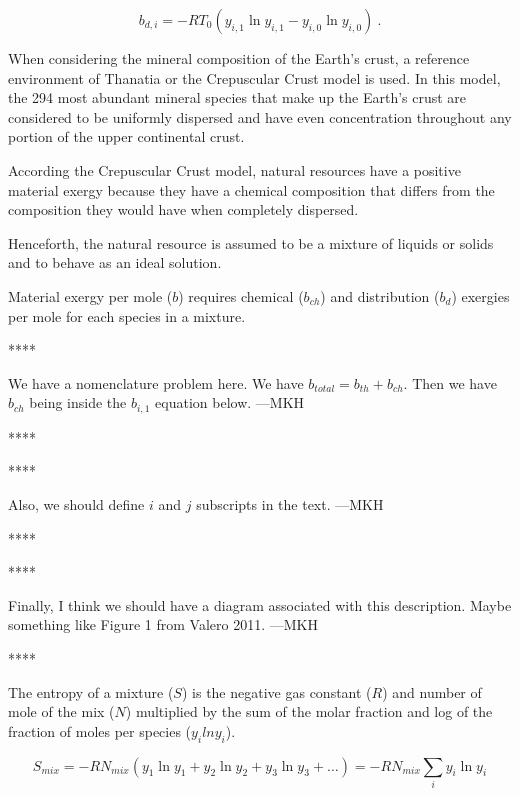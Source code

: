 \documentclass[energies,article,submit,pdftex,moreauthors]{Definitions/mdpi}
\begin{document}
\begin{equation} \label{eq:specific_distribution_exergy_from_statepoint_to_thanatia_definition}
  b_{d,i} = -RT_{0}(y_{i,1}\ln{y_{i,1}} - y_{i,0}\ln{y_{i,0}}) \ .
\end{equation}

When considering the mineral composition
of the Earth's crust,
a reference environment of Thanatia
or the Crepuscular Crust model is used.
In this model, the 294 most abundant mineral species
that make up the Earth's crust
are considered to be uniformly dispersed
and have even concentration throughout any portion
of the upper continental crust.

According the Crepuscular Crust model,
natural resources have a positive material exergy
because they have a chemical composition that
differs from the composition they would have when
completely dispersed.


Henceforth, the natural resource is assumed to be a mixture
of liquids or solids
and to behave as an ideal solution.

Material exergy per mole ($b$) requires chemical ($b_{ch}$) and distribution ($b_d$) exergies per mole
for each species in a mixture.


****

We have a nomenclature problem here.
We have $b_{total} = b_{th} + b_{ch}$.
Then we have
$b_{ch}$ being inside the $b_{i,1}$ equation below.
---MKH

****

****

Also, we should define $i$ and $j$ subscripts in the text.
---MKH

****

****

Finally, I think we should have a diagram associated with this description.
Maybe something like Figure 1 from Valero 2011.
---MKH

****


The entropy of a mixture ($S$) is the negative gas constant ($R$)
and number of mole of the mix ($N$)
multiplied by the sum of the molar fraction
and log of the fraction of moles per species ($y_i$$lny_i$).

\begin{equation}\label{eq:specific_entropy_of_mixture_definition}
  S_{mix} = -RN_{mix}(y_{1}\ln{y_{1}} + y_{2}\ln{y_{2}} + y_{3}\ln{y_{3}} + \ldots)
          = -RN_{mix}\sum_{i} y_{i}\ln{y_{i}}
\end{equation}
\end{document}
